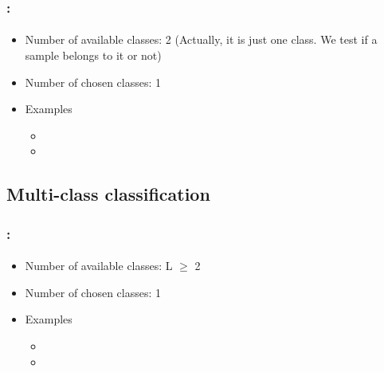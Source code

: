 \documentclass[xcolor=table]{beamer}
\begin{document}
\begin{frame}
	\frametitle{\insertshortsubtitle: \insertsection}
	\framesubtitle{\insertsubsection}
	
	\begin{minipage}{0.65\textwidth}
	\begin{itemize}
		\item Number of available classes: 2 (Actually, it is just one class. We test if a sample belongs to it or not)
		\item Number of chosen classes: 1
		\item Examples
		\begin{itemize}
			\item {}
			\item {}
		\end{itemize}
	\end{itemize}
	\end{minipage}
	\begin{minipage}{0.3\textwidth}
	\end{minipage}
	
\end{frame}

\subsection{Multi-class classification}

\begin{frame}
	\frametitle{\insertshortsubtitle: \insertsection}
	\framesubtitle{\insertsubsection}
	
	\begin{minipage}{0.65\textwidth}
	\begin{itemize}
		\item Number of available classes: L $ \ge $ 2
		\item Number of chosen classes: 1
		\item Examples
		\begin{itemize}
			\item {}
			\item {}
		\end{itemize}
	\end{itemize}
	\end{minipage}
	\begin{minipage}{0.3\textwidth}
	\end{minipage}
	
\end{frame}
\end{document}
